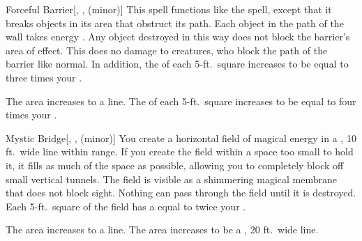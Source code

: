 \lowercase{\hypertarget{spell:Forceful Barrier}{}}\label{spell:Forceful Barrier}
\begin{freeability}[Rank 3]{\hypertarget{spell:Forceful Barrier}{Forceful Barrier}}[, ,  (minor)]
\targetrule
This spell functions like the  spell, except that it breaks objects in its area that obstruct its path.
Each object in the path of the wall takes energy .
Any object destroyed in this way does not block the barrier's area of effect.
This does no damage to creatures, who block the path of the barrier like normal.
In addition, the  of each 5-ft.\ square increases to be equal to three times your .

\rankline
{} The area increases to a \arealarge line.
 The  of each 5-ft.\ square increases to be equal to four times your .
\end{freeability}
\vspace{0.25em}



\lowercase{\hypertarget{spell:Mystic Bridge}{}}\label{spell:Mystic Bridge}
\begin{freeability}[Rank 3]{\hypertarget{spell:Mystic Bridge}{Mystic Bridge}}[, ,  (minor)]
\targetrule
You create a horizontal field of magical energy in a \areamed, 10 ft.\ wide line within \rngmed range.
If you create the field within a space too small to hold it, it fills as much of the space as possible, allowing you to completely block off small vertical tunnels.
The field is visible as a shimmering magical membrane that does not block sight.
Nothing can pass through the field until it is destroyed.
Each 5-ft.\ square of the field has a  equal to twice your .

\rankline
{} The area increases to a \arealarge line.
 The area increases to be a \areahuge, 20 ft.\ wide line.
\end{freeability}
\vspace{0.25em}




